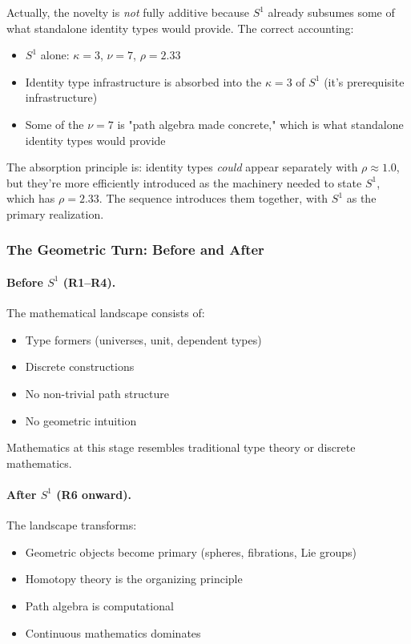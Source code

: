 \documentclass[11pt]{article}
\theoremstyle{definition}
\begin{document}
Actually, the novelty is \emph{not} fully additive because $S^1$ already subsumes some of what standalone identity types would provide. The correct accounting:
\begin{itemize}
\item $S^1$ alone: $\kappa=3$, $\nu=7$, $\rho=2.33$
\item Identity type infrastructure is absorbed into the $\kappa=3$ of $S^1$ (it's prerequisite infrastructure)
\item Some of the $\nu=7$ is "path algebra made concrete," which is what standalone identity types would provide
\end{itemize}

The absorption principle is: identity types \emph{could} appear separately with $\rho \approx 1.0$, but they're more efficiently introduced as the machinery needed to state $S^1$, which has $\rho=2.33$. The sequence introduces them together, with $S^1$ as the primary realization.

\subsubsection{The Geometric Turn: Before and After}

\paragraph{Before $S^1$ (R1--R4).}
The mathematical landscape consists of:
\begin{itemize}
\item Type formers (universes, unit, dependent types)
\item Discrete constructions
\item No non-trivial path structure
\item No geometric intuition
\end{itemize}

Mathematics at this stage resembles traditional type theory or discrete mathematics.

\paragraph{After $S^1$ (R6 onward).}
The landscape transforms:
\begin{itemize}
\item Geometric objects become primary (spheres, fibrations, Lie groups)
\item Homotopy theory is the organizing principle
\item Path algebra is computational
\item Continuous mathematics dominates
\end{itemize}
\end{document}
